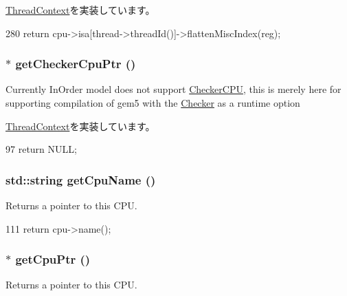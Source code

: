 \hyperlink{classThreadContext_a8014f007a20a06d35f8b13adc3a05816}{ThreadContext}を実装しています。


\begin{DoxyCode}
280     { return cpu->isa[thread->threadId()]->flattenMiscIndex(reg); }
\end{DoxyCode}
\hypertarget{classInOrderThreadContext_a0807ebbe39e158fdf6007ca00e3f7252}{
\subsubsection[{getCheckerCpuPtr}]{$\ast$ getCheckerCpuPtr ()}}
\label{classInOrderThreadContext_a0807ebbe39e158fdf6007ca00e3f7252}
Currently InOrder model does not support \hyperlink{classCheckerCPU}{CheckerCPU}, this is merely here for supporting compilation of gem5 with the \hyperlink{classChecker}{Checker} as a runtime option 

\hyperlink{classThreadContext_a78c10882b34a6238eac936f6913f9918}{ThreadContext}を実装しています。


\begin{DoxyCode}
97 { return NULL; }
\end{DoxyCode}
\hypertarget{classInOrderThreadContext_a096dc0eb4fc10d75220e3a101256340b}{
\subsubsection[{getCpuName}]{\setlength{\rightskip}{0pt plus 5cm}std::string getCpuName ()}}
\label{classInOrderThreadContext_a096dc0eb4fc10d75220e3a101256340b}
Returns a pointer to this CPU. 


\begin{DoxyCode}
111 { return cpu->name(); }
\end{DoxyCode}
\hypertarget{classInOrderThreadContext_a4f35ce7d5cb2ec57504bc2c2bc03c879}{
\subsubsection[{getCpuPtr}]{$\ast$ getCpuPtr ()}}
\label{classInOrderThreadContext_a4f35ce7d5cb2ec57504bc2c2bc03c879}
Returns a pointer to this CPU. 

